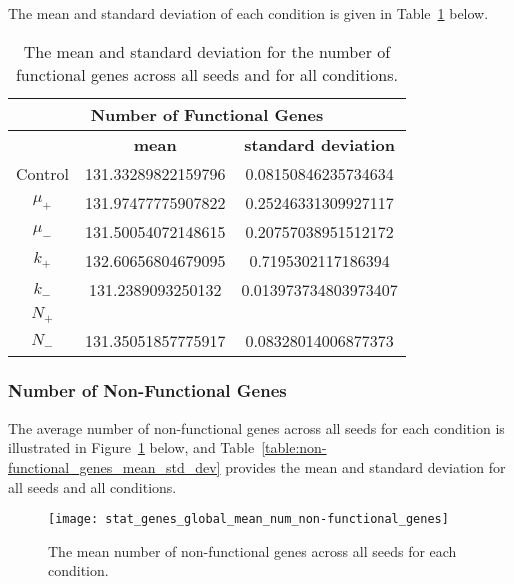 The mean and standard deviation of each condition is given in Table~\ref{table:number_of_genes_mean_std_dev} below.

\begin{table}[H]
	\centering
	\begin{tabular}{|c|c|c|}
		\hline
		\multicolumn{3}{c}{\Large \textbf{Number of Functional Genes}} \\
		\hline
		& \textbf{mean} & \textbf{standard deviation} \\
		\hline
		Control & 131.33289822159796 & 0.08150846235734634 \\
		\hline
		$\mu_+$ & 131.97477775907822 & 0.25246331309927117 \\
		\hline
		$\mu_-$ & 131.50054072148615 & 0.20757038951512172 \\
		\hline
		$k_+$ & 132.60656804679095 & 0.7195302117186394 \\ 
		\hline
		$k_-$ & 131.2389093250132 & 0.013973734803973407 \\
		\hline
		$N_+$ & & \\
		\hline
		$N_-$ & 131.35051857775917 & 0.08328014006877373 \\
		\hline
	\end{tabular}
	\caption[Number of functional genes - mean and standard deviation]{The mean and standard deviation for the number of functional genes across all seeds and for all conditions.}
	\label{table:number_of_genes_mean_std_dev}
\end{table}
\subsubsection{Number of Non-Functional Genes}
The average number of non-functional genes across all seeds for each condition is illustrated in Figure~\ref{fig:mean_num_non-functional_genes} below, and Table~\ref{table:non-functional_genes_mean_std_dev} provides the mean and standard deviation for all seeds and all conditions.  

\begin{figure}[H]
	\centering
	\texttt{[image: stat\_genes\_global\_mean\_num\_non-functional\_genes]}
	\caption[Mean number of non-functional genes]{The mean number of non-functional genes across all seeds for each condition.}
	\label{fig:mean_num_non-functional_genes}
\end{figure}


